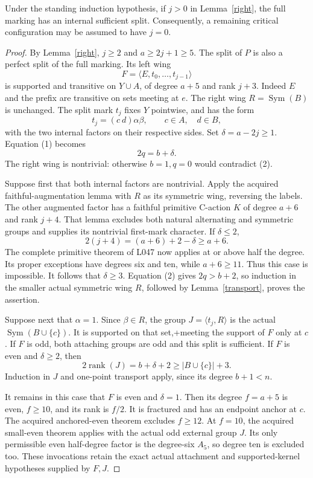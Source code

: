 \documentclass[11pt,a4paper]{article}
\newcommand{\gen}[1]{\langle#1\rangle}
\newcommand{\Sym}{\operatorname{Sym}}
\begin{document}
\begin{theorem}\label{away}
Under the standing induction hypothesis, if $j>0$ in
Lemma~\ref{right}, the full marking has an internal
sufficient split. Consequently, a remaining critical
configuration may be assumed to have $j=0$.
\end{theorem}
\begin{proof}
By Lemma~\ref{right}, $j\ge2$ and $a\ge2j+1\ge5$.
The split of $P$ is also a perfect split of the full
marking. Its left wing
\[
 F=\gen{E,t_0,\ldots,t_{j-1}}
\]
is supported and transitive on $Y\cup A$, of degree
$a+5$ and rank $j+3$. Indeed $E$ and the prefix are
transitive on sets meeting at $e$. The right wing
$R=\Sym(B)$ is unchanged. The split mark $t_j$ fixes
$Y$ pointwise, and has the form
\[
                  t_j=(c\ d)\alpha\beta,
   \qquad c\in A,\quad d\in B,
\]
with the two internal factors on their respective sides.
Set $\delta=a-2j\ge1$. Equation (1) becomes
\[
                             2q=b+\delta.              \tag{2}
\]
The right wing is nontrivial: otherwise $b=1,q=0$
would contradict (2).

Suppose first that both internal factors are nontrivial.
Apply the acquired faithful-augmentation lemma with $R$
as its symmetric wing, reversing the labels. The other
augmented factor has a faithful primitive C-action $K$
of degree $a+6$ and rank $j+4$. That lemma excludes both
natural alternating and symmetric groups and supplies
its nontrivial first-mark character. If $\delta\le2$,
\[
                      2(j+4)=(a+6)+2-\delta\ge a+6.
\]
The complete primitive theorem of L047 now applies at
or above half the degree. Its proper exceptions have
degrees six and ten, while $a+6\ge11$. Thus this case
is impossible. It follows that $\delta\ge3$.
Equation (2) gives $2q>b+2$, so induction in the smaller
actual symmetric wing $R$, followed by
Lemma~\ref{transport}, proves the assertion.

Suppose next that $\alpha=1$. Since $\beta\in R$,
the group $J=\gen{t_j,R}$ is the actual
$\Sym(B\cup\{c\})$. It is supported on that set,+meeting the support of $F$ only at $c$. If $F$ is odd,
both attaching groups are odd and this split is sufficient.
If $F$ is even and $\delta\ge2$, then
\[
              2\operatorname{rank}(J)=b+\delta+2
                            \ge |B\cup\{c\}|+3.
\]
Induction in $J$ and one-point transport apply, since
its degree $b+1<n$.

It remains in this case that $F$ is even and $\delta=1$.
Then its degree $f=a+5$ is even, $f\ge10$, and its
rank is $f/2$. It is fractured and has an endpoint
anchor at $c$. The acquired anchored-even theorem
excludes $f\ge12$. At $f=10$, the acquired small-even
theorem applies with the actual odd external group $J$.
Its only permissible even half-degree factor is the
degree-six $A_5$, so degree ten is excluded too.
These invocations retain the exact actual attachment
and supported-kernel hypotheses supplied by $F,J$.


\end{proof}
\end{document}
